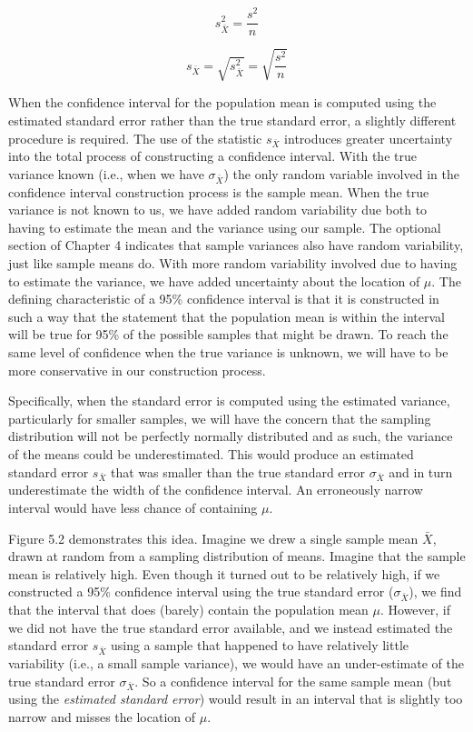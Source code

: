\documentclass[12pt]{article}
\begin{document}
\newpage


\begin{equation}
s_{\bar{X}}^2 = \frac{s^2}{n} \tag{5.3}
\end{equation}

\begin{equation}
s_{\bar{X}} = \sqrt{s_{\bar{X}}^2} = \sqrt{\frac{s^2}{n}} \tag{5.4}
\end{equation}

When the confidence interval for the population mean is computed using the estimated standard error rather than the true standard error, a slightly different procedure is required. The use of the statistic $s_{\bar{X}}$ introduces greater uncertainty into the total process of constructing a confidence interval. With the true variance known (i.e., when we have $\sigma_{\bar{X}}$) the only random variable involved in the confidence interval construction process is the sample mean. When the true variance is not known to us, we have added random variability due both to having to estimate the mean and the variance using our sample. The optional section of Chapter 4 indicates that sample variances also have random variability, just like sample means do. With more random variability involved due to having to estimate the variance, we have added uncertainty about the location of $\mu$. The defining characteristic of a 95\% confidence interval is that it is constructed in such a way that the statement that the population mean is within the interval will be true for 95\% of the possible samples that might be drawn. To reach the same level of confidence when the true variance is unknown, we will have to be more conservative in our construction process.

Specifically, when the standard error is computed using the estimated variance, particularly for smaller samples, we will have the concern that the sampling distribution will not be perfectly normally distributed and as such, the variance of the means could be underestimated. This would produce an estimated standard error $s_{\bar{X}}$ that was smaller than the true standard error $\sigma_{\bar{X}}$ and in turn underestimate the width of the confidence interval. An erroneously narrow interval would have less chance of containing $\mu$.

Figure 5.2 demonstrates this idea. Imagine we drew a single sample mean $\bar{X}$, drawn at random from a sampling distribution of means. Imagine that the sample mean is relatively high. Even though it turned out to be relatively high, if we constructed a 95\% confidence interval using the true standard error ($\sigma_{\bar{X}}$), we find that the interval that does (barely) contain the population mean $\mu$. However, if we did not have the true standard error available, and we instead estimated the standard error $s_{\bar{X}}$ using a sample that happened to have relatively little variability (i.e., a small sample variance), we would have an under-estimate of the true standard error $\sigma_{\bar{X}}$. So a confidence interval for the same sample mean (but using the \textit{estimated standard error}) would result in an interval that is slightly too narrow and misses the location of $\mu$.
\end{document}
